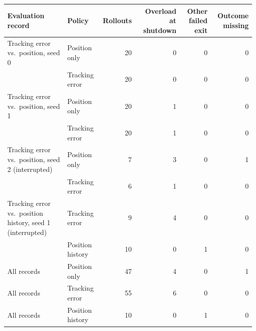 \begin{tabular}{llrrrr}
\toprule
Evaluation record & Policy & Rollouts & Overload at shutdown & Other failed exit & Outcome missing \\
\midrule
Tracking error vs.\ position, seed 0 & Position only & 20 & 0 & 0 & 0 \\
 & Tracking error & 20 & 0 & 0 & 0 \\
\addlinespace
Tracking error vs.\ position, seed 1 & Position only & 20 & 1 & 0 & 0 \\
 & Tracking error & 20 & 1 & 0 & 0 \\
\addlinespace
Tracking error vs.\ position, seed 2 (interrupted) & Position only & 7 & 3 & 0 & 1 \\
 & Tracking error & 6 & 1 & 0 & 0 \\
\addlinespace
Tracking error vs.\ position history, seed 1 (interrupted) & Tracking error & 9 & 4 & 0 & 0 \\
 & Position history & 10 & 0 & 1 & 0 \\
\midrule
All records & Position only & 47 & 4 & 0 & 1 \\
All records & Tracking error & 55 & 6 & 0 & 0 \\
All records & Position history & 10 & 0 & 1 & 0 \\
\bottomrule
\end{tabular}
